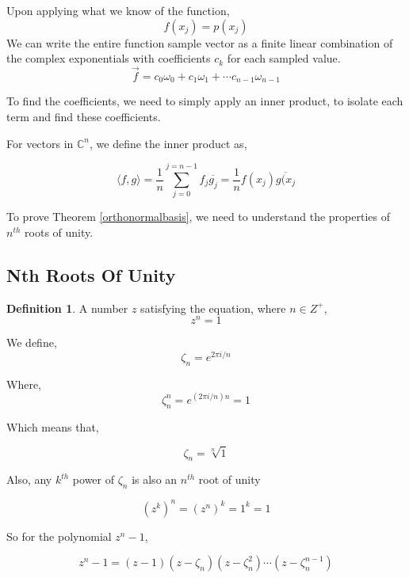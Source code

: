 \documentclass[11pt]{amsart}
\theoremstyle{definition}
\newtheorem{defn}[thm]{Definition}
\theoremstyle{remark}
\numberwithin{equation}{section}
\begin{document}
Upon applying what we know of the function,
\[
	f(x_j) = p(x_j)
\]
We can write the entire function sample vector as a finite linear combination of the complex exponentials with coefficients $c_k$ for each sampled value.
\begin{equation}
	\vec{f} = c_0 \omega_0 + c_1 \omega_1 + \cdots c_{n-1} \omega_{n-1}
	\label{complexeform}
\end{equation}

To find the coefficients, we need to simply apply an inner product, to isolate each term and find these coefficients.

For vectors in $\mathbb{C}^n$, we define the inner product as,

\[
	\langle f,g \rangle = \frac{1}{n} \sum_{j = 0}^{j = n-1} f_j \overline{g_j} = \frac{1}{n} f(x_j) \overline{g(x_j}
\]

To prove Theorem \ref{orthonormalbasis}, we need to understand the properties of $n^{th}$ roots of unity.

\subsection{Nth Roots Of Unity}
\begin{defn}
A number $z$ satisfying the equation, where $n \in Z^+$,
\[
	z^n = 1
\]
\end{defn}
We define, 
\[
	\zeta_n = e^{2 \pi i/n}
\]

Where,
\[
	\zeta_n^n = e^{(2 \pi i / n)n} = 1
\]

Which means that,

\[
	\zeta_n = \sqrt[n]{1}
\]

Also, any $k^{th}$ power of $\zeta_n$ is also an $n^{th}$ root of unity

\[
	(z^k)^n = (z^n)^k = 1^k = 1
\]

So for the polynomial $z^n - 1$,

\[
		z^{n}-1 = (z-1)(z -  \zeta_n)(z-\zeta_n^2)\cdots(z - \zeta_n^{n-1}) 
\]
\end{document}
